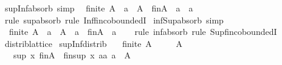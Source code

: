 \begin{isabellebody}
\isamarkupfalse%
\ sup{\isacharunderscore}{\kern0pt}Inf{\isacharunderscore}{\kern0pt}absorb\ {\isacharbrackleft}{\kern0pt}simp{\isacharbrackright}{\kern0pt}{\isacharcolon}{\kern0pt}\isanewline
\ \ {\isachardoublequoteopen}finite\ A\ {\isasymLongrightarrow}\ a\ {\isasymin}\ A\ {\isasymLongrightarrow}\ {\isasymSqinter}\isactrlsub f\isactrlsub i\isactrlsub nA\ {\isasymsqunion}\ a\ {\isacharequal}{\kern0pt}\ a{\isachardoublequoteclose}\isanewline
%
\isadelimproof
\ \ %
\endisadelimproof
%
\isatagproof
{}\isamarkupfalse%
\ {\isacharparenleft}{\kern0pt}rule\ sup{\isacharunderscore}{\kern0pt}absorb{}{\isacharparenright}{\kern0pt}\ {\isacharparenleft}{\kern0pt}rule\ Inf{\isacharunderscore}{\kern0pt}fin{\isachardot}{\kern0pt}coboundedI{\isacharparenright}{\kern0pt}%
\endisatagproof
{\isafoldproof}%
%
\isadelimproof
\isanewline
%
\endisadelimproof
\isanewline
{}\isamarkupfalse%
\ inf{\isacharunderscore}{\kern0pt}Sup{\isacharunderscore}{\kern0pt}absorb\ {\isacharbrackleft}{\kern0pt}simp{\isacharbrackright}{\kern0pt}{\isacharcolon}{\kern0pt}\isanewline
\ \ {\isachardoublequoteopen}finite\ A\ {\isasymLongrightarrow}\ a\ {\isasymin}\ A\ {\isasymLongrightarrow}\ a\ {\isasymsqinter}\ {\isasymSqunion}\isactrlsub f\isactrlsub i\isactrlsub nA\ {\isacharequal}{\kern0pt}\ a{\isachardoublequoteclose}\isanewline
%
\isadelimproof
\ \ %
\endisadelimproof
%
\isatagproof
{}\isamarkupfalse%
\ {\isacharparenleft}{\kern0pt}rule\ inf{\isacharunderscore}{\kern0pt}absorb{}{\isacharparenright}{\kern0pt}\ {\isacharparenleft}{\kern0pt}rule\ Sup{\isacharunderscore}{\kern0pt}fin{\isachardot}{\kern0pt}coboundedI{\isacharparenright}{\kern0pt}%
\endisatagproof
{\isafoldproof}%
%
\isadelimproof
\isanewline
%
\endisadelimproof
\isanewline
{}\isamarkupfalse%
\isanewline
\isanewline
{}\isamarkupfalse%
\ distrib{\isacharunderscore}{\kern0pt}lattice\isanewline
{}\isanewline
\isanewline
{}\isamarkupfalse%
\ sup{\isacharunderscore}{\kern0pt}Inf{}{\isacharunderscore}{\kern0pt}distrib{\isacharcolon}{\kern0pt}\isanewline
\ \ \ {\isachardoublequoteopen}finite\ A{\isachardoublequoteclose}\isanewline
\ \ \ \ \ {\isachardoublequoteopen}A\ {\isasymnoteq}\ {\isacharbraceleft}{\kern0pt}{\isacharbraceright}{\kern0pt}{\isachardoublequoteclose}\isanewline
\ \ \ {\isachardoublequoteopen}sup\ x\ {\isacharparenleft}{\kern0pt}{\isasymSqinter}\isactrlsub f\isactrlsub i\isactrlsub nA{\isacharparenright}{\kern0pt}\ {\isacharequal}{\kern0pt}\ {\isasymSqinter}\isactrlsub f\isactrlsub i\isactrlsub n{\isacharbraceleft}{\kern0pt}sup\ x\ a{\isacharbar}{\kern0pt}a{\isachardot}{\kern0pt}\ a\ {\isasymin}\ A{\isacharbraceright}{\kern0pt}{\isachardoublequoteclose}\isanewline

\end{isabellebody}
